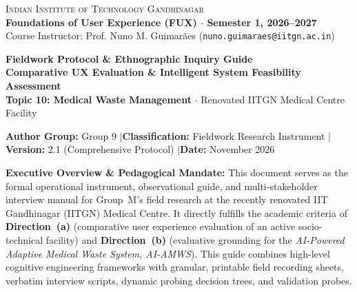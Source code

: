 \documentclass[11pt,a4paper]{article}
\begin{document}
\begin{center}
    {\large\scshape Indian Institute of Technology Gandhinagar}\\[3pt]
    {\small\textbf{Foundations of User Experience (FUX) $\cdot$ Semester 1, 2026--2027}}\\[2pt]
    {\footnotesize Course Instructor: Prof. Nuno M. Guimar\~aes (\texttt{nuno.guimaraes@iitgn.ac.in})}\\[10pt]
    
    \begin{mdframed}[linecolor=iitblue, linewidth=1.5pt, backgroundcolor=softgray, roundcorner=4pt, innertopmargin=10pt, innerbottommargin=10pt]
        \centering
        {\LARGE\bfseries\color{iitblue} Fieldwork Protocol \& Ethnographic Inquiry Guide}\\[4pt]
        {\large\bfseries Comparative UX Evaluation \& Intelligent System Feasibility Assessment}\\[3pt]
        {\small\color{darkcharcoal}\textbf{Topic 10: Medical Waste Management} $\cdot$ Renovated IITGN Medical Centre Facility}
    \end{mdframed}
    \vspace{4pt}
    {\footnotesize \textbf{Author Group:} Group 9 \quad$\vert$\quad \textbf{Classification:} Fieldwork Research Instrument \quad$\vert$\quad \textbf{Version:} 2.1 (Comprehensive Protocol) \quad$\vert$\quad \textbf{Date:} November 2026}
\end{center}

\vspace{4pt}

\begin{infobox}
\noindent\textbf{\color{iitblue}Executive Overview \& Pedagogical Mandate:}  
This document serves as the formal operational instrument, observational guide, and multi-stakeholder interview manual for Group~M's field research at the recently renovated IIT Gandhinagar (IITGN) Medical Centre. It directly fulfills the academic criteria of \textbf{Direction~(a)} (comparative user experience evaluation of an active socio-technical facility) and \textbf{Direction~(b)} (evaluative grounding for the \emph{AI-Powered Adaptive Medical Waste System, AI-AMWS}). This guide combines high-level cognitive engineering frameworks with granular, printable field recording sheets, verbatim interview scripts, dynamic probing decision trees, and validation probes.
\end{infobox}
\end{document}

